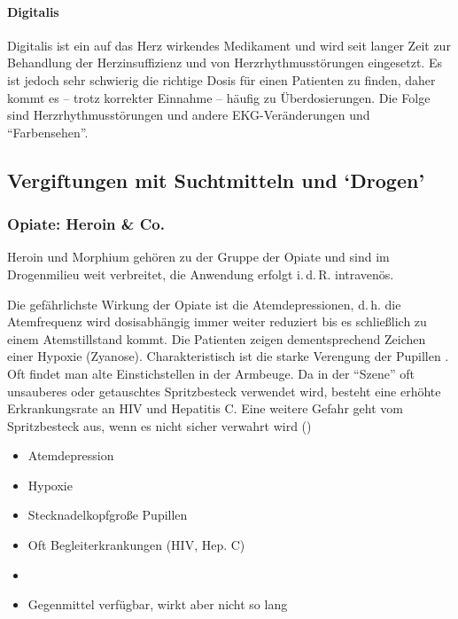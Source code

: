{{\paragraph{Digitalis} Digitalis ist ein auf das Herz
wirkendes Medikament und wird seit langer Zeit zur
Behandlung der Herzinsuffizienz und von
Herzrhythmusstörungen eingesetzt. Es ist jedoch sehr
schwierig die richtige Dosis für einen Patienten zu finden,
daher kommt es -- trotz korrekter Einnahme -- häufig zu
Überdosierungen. Die Folge sind Herzrhythmusstörungen und
andere EKG-Veränderungen und \enquote{Farbensehen}.
}

\subsection{Vergiftungen mit Suchtmitteln und
\enquote*{Drogen}}

\subsubsection{Opiate: Heroin \& Co.}

Heroin und Morphium gehören zu der Gruppe der Opiate und
sind im Drogenmilieu weit verbreitet, die Anwendung erfolgt
i.\,d.\,R. intravenös. 

{%
Die gefährlichste Wirkung der Opiate ist die
Atemdepressionen, d.\,h. die Atemfrequenz wird dosisabhängig
immer weiter reduziert bis es schließlich zu einem
Atemstillstand kommt. Die Patienten zeigen
dementsprechend Zeichen einer Hypoxie
(Zyanose). Charakteristisch ist die starke Verengung der
Pupillen . Oft
findet man alte Einstichstellen in der Armbeuge. Da in der
\enquote{Szene} oft unsauberes oder getauschtes Spritzbesteck
verwendet wird, besteht eine erhöhte Erkrankungsrate an HIV
und Hepatitis C. Eine weitere Gefahr geht vom Spritzbesteck
aus, wenn es nicht sicher verwahrt wird ()

\bigskip

\bigskip

\bigskip
}{
\begin{itemize}
    \item Atemdepression
    \item Hypoxie
    \item Stecknadelkopfgroße Pupillen
    \item Oft Begleiterkrankungen (HIV, Hep. C) 
    \item {}
    \item Gegenmittel verfügbar, wirkt aber nicht so lang
\end{itemize}
}{}{}{}

}
